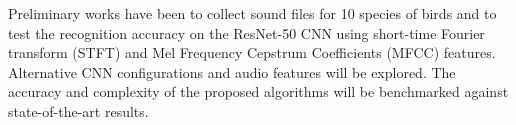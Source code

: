 Preliminary works have been to collect sound files for 10 species of birds and to test the recognition accuracy on the ResNet-50 CNN using short-time Fourier transform (STFT) and Mel Frequency Cepstrum Coefficients (MFCC) features. %
 Alternative CNN configurations and audio features will be explored. The accuracy and complexity of the proposed algorithms will be benchmarked against state-of-the-art results.